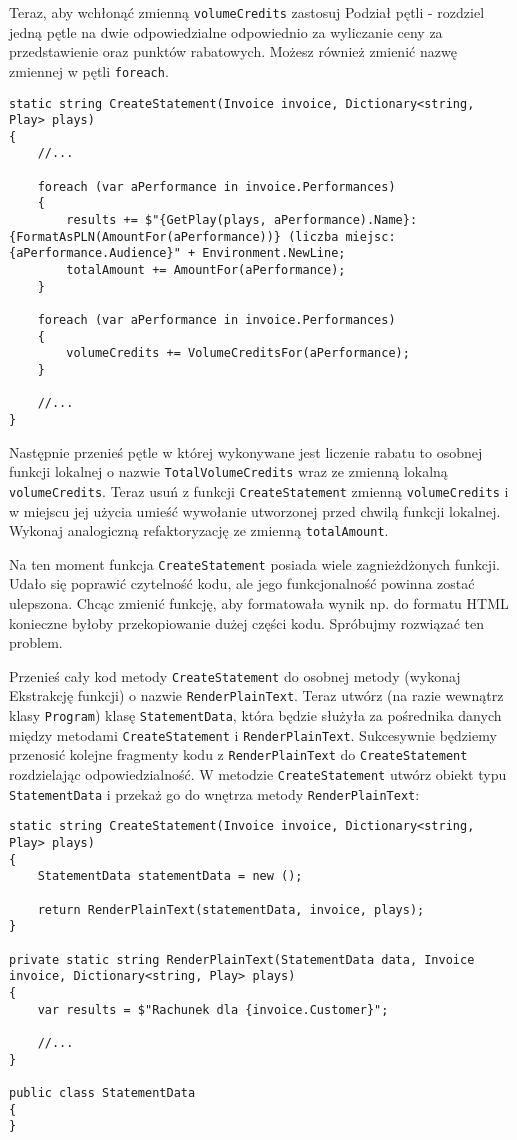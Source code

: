 Teraz, aby wchłonąć zmienną \texttt{volumeCredits} zastosuj Podział pętli - rozdziel jedną pętle na dwie odpowiedzialne odpowiednio za wyliczanie ceny za przedstawienie oraz punktów rabatowych. Możesz również zmienić nazwę zmiennej w pętli \texttt{foreach}.
\begin{lstlisting}
static string CreateStatement(Invoice invoice, Dictionary<string, Play> plays)
{
	//...	
	
	foreach (var aPerformance in invoice.Performances)
	{
		results += $"{GetPlay(plays, aPerformance).Name}: {FormatAsPLN(AmountFor(aPerformance))} (liczba miejsc: {aPerformance.Audience}" + Environment.NewLine;
		totalAmount += AmountFor(aPerformance);
	}
	
	foreach (var aPerformance in invoice.Performances)
	{
		volumeCredits += VolumeCreditsFor(aPerformance);
	}
	
	//...
}
\end{lstlisting}
Następnie przenieś pętle w której wykonywane jest liczenie rabatu to osobnej funkcji lokalnej o nazwie \texttt{TotalVolumeCredits} wraz ze zmienną lokalną \texttt{volumeCredits}. Teraz usuń z funkcji \texttt{CreateStatement} zmienną \texttt{volumeCredits} i w miejscu jej użycia umieść wywołanie utworzonej przed chwilą funkcji lokalnej. Wykonaj analogiczną refaktoryzację ze zmienną \texttt{totalAmount}.

Na ten moment funkcja \texttt{CreateStatement} posiada wiele zagnieżdżonych funkcji. Udało się poprawić czytelność kodu, ale jego funkcjonalność powinna zostać ulepszona. Chcąc zmienić funkcję, aby formatowała wynik np. do formatu HTML konieczne byłoby przekopiowanie dużej części kodu. Spróbujmy rozwiązać ten problem.

Przenieś cały kod metody \texttt{CreateStatement} do osobnej metody (wykonaj Ekstrakcję funkcji) o nazwie \texttt{RenderPlainText}. Teraz utwórz (na razie wewnątrz klasy \texttt{Program}) klasę \texttt{StatementData}, która będzie służyła za pośrednika danych między metodami \texttt{CreateStatement} i \texttt{RenderPlainText}. Sukcesywnie będziemy przenosić kolejne fragmenty kodu z \texttt{RenderPlainText} do \texttt{CreateStatement} rozdzielając odpowiedzialność. W metodzie \texttt{CreateStatement} utwórz obiekt typu \texttt{StatementData} i przekaż go do wnętrza metody \texttt{RenderPlainText}:
\begin{lstlisting}
static string CreateStatement(Invoice invoice, Dictionary<string, Play> plays)
{
	StatementData statementData = new ();
	
	return RenderPlainText(statementData, invoice, plays);
}

private static string RenderPlainText(StatementData data, Invoice invoice, Dictionary<string, Play> plays)
{
	var results = $"Rachunek dla {invoice.Customer}";
		
	//...
}

public class StatementData
{
}
\end{lstlisting}

